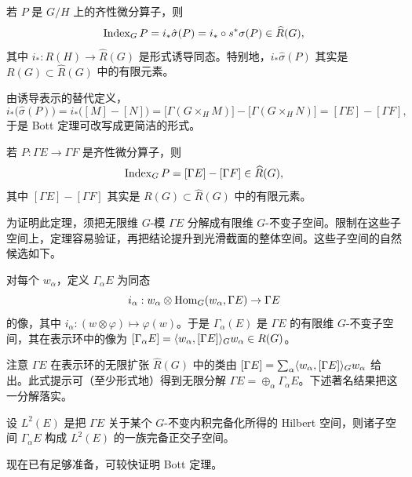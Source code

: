 \begin{theorem}[Bott]
若 $P$ 是 $G/H$ 上的齐性微分算子，则
\[
\operatorname{Index}_G P=i_*\hat\sigma(P)=i_*\circ s^*\sigma(P)\in\widehat R(G),
\]
其中 $i_*:R(H)\to\widehat R(G)$ 是形式诱导同态。特别地，$i_*\hat\sigma(P)$ 其实是 $R(G)\subset\widehat R(G)$ 中的有限元素。
\end{theorem}


由诱导表示的替代定义，
\[
i_*\big(\hat\sigma(P)\big)=i_*\big([M]-[N]\big)=\big[\Gamma(G\times_H M)\big]-\big[\Gamma(G\times_H N)\big]=[\Gamma E]-[\Gamma F],
\]
于是 Bott 定理可改写成更简洁的形式。

\begin{theorem}
若 $P:\Gamma E\to\Gamma F$ 是齐性微分算子，则
\[
\operatorname{Index}_G P=[\Gamma E]-[\Gamma F]\in\widehat R(G),
\]
其中 $[\Gamma E]-[\Gamma F]$ 其实是 $R(G)\subset\widehat R(G)$ 中的有限元素。
\end{theorem}

为证明此定理，须把无限维 $G$-模 $\Gamma E$ 分解成有限维 $G$-不变子空间。限制在这些子空间上，定理容易验证，再把结论提升到光滑截面的整体空间。这些子空间的自然候选如下。

\begin{definition}
对每个 $w_\alpha$，定义 $\Gamma_\alpha E$ 为同态
\[
i_\alpha:w_\alpha\otimes\operatorname{Hom}_G(w_\alpha,\Gamma E)\to\Gamma E
\]
的像，其中 $i_\alpha:(w\otimes\varphi)\mapsto\varphi(w)$。于是 $\Gamma_\alpha(E)$ 是 $\Gamma E$ 的有限维 $G$-不变子空间，其在表示环中的像为 $[\Gamma_\alpha E]=\langle w_\alpha,[\Gamma E]\rangle_G w_\alpha\in R(G)$。
\end{definition}

注意 $\Gamma E$ 在表示环的无限扩张 $\widehat R(G)$ 中的类由 $[\Gamma E]=\sum_\alpha\langle w_\alpha,[\Gamma E]\rangle_G w_\alpha$ 给出。此式提示可（至少形式地）得到无限分解 $\Gamma E=\oplus_\alpha\Gamma_\alpha E$。下述著名结果把这一分解落实。

\begin{lemma}
设 $L^2(E)$ 是把 $\Gamma E$ 关于某个 $G$-不变内积完备化所得的 Hilbert 空间，则诸子空间 $\Gamma_\alpha E$ 构成 $L^2(E)$ 的一族完备正交子空间。
\end{lemma}

现在已有足够准备，可较快证明 Bott 定理。

